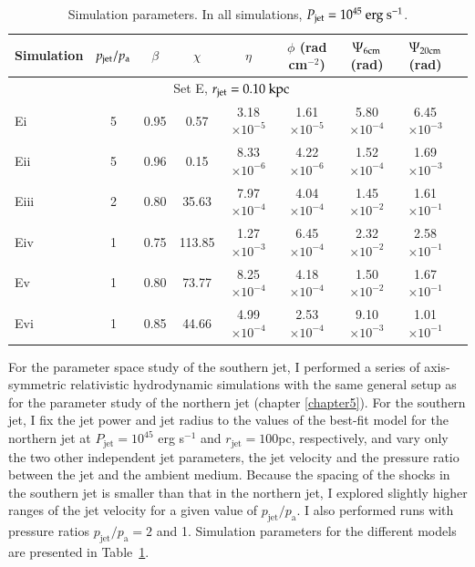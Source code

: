 \begin{table}
\caption{Simulation parameters. In all simulations, $P_{\rm{jet}}=10^{45} \rm \ erg \ s^{-1}$.}
\centering
\begin{tabular}{l * {8}{c}}
\hline \hline
Simulation  & $p_{\rm{jet}}/p_{\rm{a}}$ & $\beta$ & $\chi$ & $\eta$ & $\phi$ (rad cm$^{-2}$) & $\Psi_{6\rm{cm}}$ (rad) & $\Psi_{20\rm{cm}}$ (rad) \\
\hline
	\multicolumn{8}{c}{Set E, $r_{\rm{jet}}=0.10 \rm \ kpc$} \\ 
	\hline
  	Ei      & 5    & 0.95 & 0.57    & 3.18$\times10^{-5}$   & 1.61$\times10^{-5}$   & 5.80$\times10^{-4}$   & 6.45$\times10^{-3}$   \\
	Eii     & 5    & 0.96 & 0.15    & 8.33$\times10^{-6}$   & 4.22$\times10^{-6}$   & 1.52$\times10^{-4}$   & 1.69$\times10^{-3}$   \\
	Eiii	& 2   & 0.80 & 35.63    & 7.97$\times10^{-4}$   & 4.04$\times10^{-4}$   & 1.45$\times10^{-2}$   & 1.61$\times10^{-1}$ \\
	Eiv	& 1  & 0.75   & 113.85 & 1.27$\times10^{-3}$   & 6.45$\times10^{-4}$ & 2.32$\times10^{-2}$ & 2.58$\times10^{-1}$ \\
	Ev    & 1  &  0.80  & 73.77   &  8.25$\times10^{-4}$   & 4.18$\times10^{-4}$   & 1.50$\times10^{-2}$   & 1.67$\times10^{-1}$   \\
	Evi      & 1    & 0.85 &  44.66  & 4.99$\times10^{-4}$   & 2.53$\times10^{-4}$   & 9.10$\times10^{-3}$   & 1.01$\times10^{-1}$   \\
		\hline
\end{tabular}
\label{t:sim_par_s}
\end{table}

For the parameter space study of the southern jet, I performed a series of axis-symmetric relativistic hydrodynamic simulations with the same general setup as for the parameter study of the northern jet (chapter \ref{chapter5}). For the southern jet, I fix the jet power and jet radius to the values of the best-fit model for the northern jet at $P_\mathrm{jet} = 10^{45}$ erg s$^{-1}$ and $r_\mathrm{jet}=100$pc, respectively, and vary only the two other independent jet parameters, the jet velocity and the pressure ratio between the jet and the ambient medium. Because the spacing of the shocks in the southern jet is smaller than that in the northern jet, I explored slightly higher ranges of the jet velocity for a given value of $p_\mathrm{jet}/p_\mathrm{a}$. I  also performed runs with pressure ratios $p_\mathrm{jet}/p_\mathrm{a}=2$ and 1. Simulation parameters for the different models are presented in Table~\ref{t:sim_par_s}.

